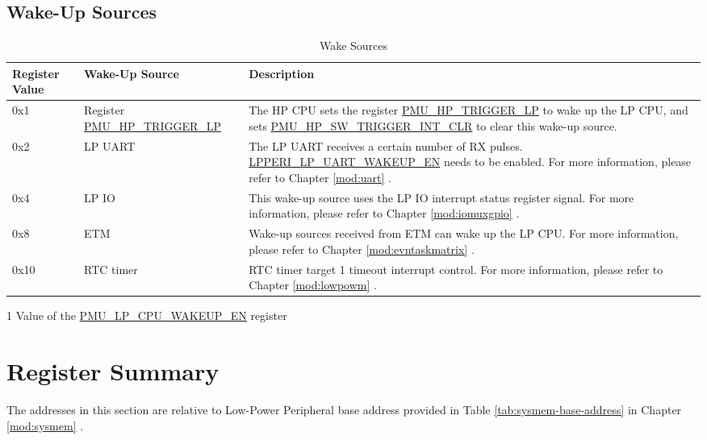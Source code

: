 \documentclass[main\_\_EN.tex]{subfiles}
\begin{document}
\subsection{Wake-Up Sources}

    \begin{table}[H]
    \centering
    \caption{Wake Sources}
    \label{tab:ulp-wake-sources}
    \begin{threeparttable}
    \begin{tabular}{| l | l | m{7cm}|}
    \hline
    \rowcolor{lightgray}
    Register Value \tnote{1} & Wake-Up Source & Description  \\\hline

    0x1 & Register \hyperref[fielddesc:PMUHPTRIGGERLP]{PMU\_HP\_TRIGGER\_LP} & The HP CPU sets the register \hyperref[fielddesc:PMUHPTRIGGERLP]{PMU\_HP\_TRIGGER\_LP} to wake up the LP CPU, and sets \hyperref[fielddesc:PMUHPSWTRIGGERINTCLR]{PMU\_HP\_SW\_TRIGGER\_INT\_CLR} to clear this wake-up source.\\\hline
    0x2 & LP UART & The LP UART receives a certain number of RX pulses. \hyperref[fielddesc:LPPERILPUARTWAKEUPEN]{LPPERI\_LP\_UART\_WAKEUP\_EN} needs to be enabled. For more information, please refer to Chapter \ref{mod:uart} \textit{\nameref{mod:uart}}. \\\hline
    0x4 & LP IO & This wake-up source uses the LP IO interrupt status register signal. For more information, please refer to Chapter \ref{mod:iomuxgpio} \textit{\nameref{mod:iomuxgpio}}. \\\hline
    0x8 & ETM & Wake-up sources received from ETM can wake up the LP CPU. For more information, please refer to Chapter \ref{mod:evntaskmatrix} \textit{\nameref{mod:evntaskmatrix}}. \\\hline
    0x10 & RTC timer & RTC timer target 1 timeout interrupt control. For more information, please refer to Chapter \ref{mod:lowpowm} \textit{\nameref{mod:lowpowm}}. \\\hline
\end{tabular}
    \begin{tablenotes}
        \item[1] Value of the \hyperref[fielddesc:PMULPCPUWAKEUPEN]{PMU\_LP\_CPU\_WAKEUP\_EN} register
    \end{tablenotes}
    \end{threeparttable}
\end{table}


\section{Register Summary}
\label{sec:ulp-lpperi-reg-summ}
The addresses in this section are relative to Low-Power Peripheral base address provided in Table \ref{tab:sysmem-base-address} in Chapter \ref{mod:sysmem} \textit{}.
\end{document}
